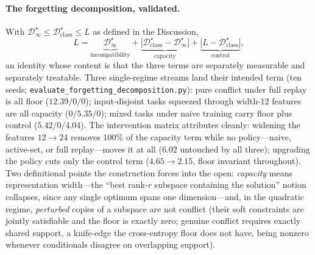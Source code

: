 \documentclass[10pt,a4paper]{article}
\theoremstyle{plain}
\theoremstyle{definition}
\begin{document}
\paragraph{The forgetting decomposition, validated.} With
$\mathcal{D}^\star_\infty\le\mathcal{D}^\star_{\mathrm{class}}\le L$ as defined in the
Discussion,
\begin{equation}
L=\underbrace{\mathcal{D}^\star_\infty}_{\text{incompatibility}}
+\underbrace{\big[\mathcal{D}^\star_{\mathrm{class}}-\mathcal{D}^\star_\infty\big]}_{\text{capacity}}
+\underbrace{\big[L-\mathcal{D}^\star_{\mathrm{class}}\big]}_{\text{control}},
\label{eq:decomposition}
\end{equation}
an identity whose content is that the three terms are separately measurable and
separately treatable. Three single-regime streams land their intended term (ten seeds;
\texttt{evaluate\_forgetting\_decomposition.py}): pure conflict under full replay is all
floor ($12.39/0/0$); input-disjoint tasks squeezed through width-$12$ features are all
capacity ($0/5.35/0$); mixed tasks under naive training carry floor plus control
($5.42/0/4.04$). The intervention matrix attributes cleanly: widening the features
$12\to24$ removes $100\%$ of the capacity term while no policy---naive, active-set, or
full replay---moves it at all ($6.02$ untouched by all three); upgrading the policy cuts
only the control term ($4.65\to2.15$, floor invariant throughout). Two definitional
points the construction forces into the open: \emph{capacity} means representation
width---the ``best rank-$r$ subspace containing the solution'' notion collapses, since
any single optimum spans one dimension---and, in the quadratic regime,
\emph{perturbed} copies of a subspace are not conflict (their soft constraints are
jointly satisfiable and the floor is exactly zero; genuine conflict requires exactly
shared support, a knife-edge the cross-entropy floor does not have, being nonzero
whenever conditionals disagree on overlapping support).
\end{document}
